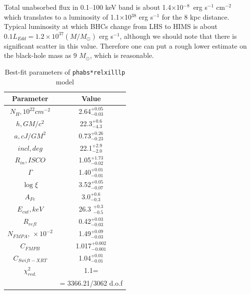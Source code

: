 \documentclass[a4paper,fleqn,usenatbib]{mnras}
\begin{document}
Total unabsorbed flux in 0.1--100 keV band is about 1.4$\times$10$^{-8}$~erg s$^{-1}$ cm$^{-2}$ which translates to a luminosity of 1.1$\times$10$^{38}$ erg s$^{-1}$ for the 8 kpc distance. 
Typical luminosity at which BHCs change from LHS to HIMS is about $0.1 L_{Edd} = 1.2\times10^{37} (M/M_{\odot})$ erg s$^{-1}$, although we should note that there is significant scatter in this value. 
Therefore one can put a rough lower estimate on the black-hole mass as 9 $M_{\odot}$, which is reasonable.

\begin{table}
\noindent
\centering
\caption{Best-fit parameters of \texttt{phabs*relxilllp} model}
\label{tab:fullfit}
\centering
\begin{tabular}{|c|c|}
\hline\hline
Parameter & Value \\
\hline
$N_{H}, 10^{22} cm^{-2}$ &   2.64$^{+0.05}_{-0.03}$ \\   
$h, GM/c^{2}$   &  22.3$^{+0.6}_{-4.3}$ \\
$a, cJ/GM^{2}$    & 0.73$^{+0.26}_{-0.23}$   \\
$incl, deg$ & 22.1$^{+2.9}_{-2.0}$ \\
$R_{in}, ISCO$  & 1.05$^{+1.73}_{-0.02}$ \\ 
$\Gamma$& 1.40$^{+0.01}_{-0.01}$   \\
$\log{\xi}$ &  3.52$^{+0.05}_{-0.07}$ \\
$A_{Fe}$   &  3.0$^{+0.6}_{-0.3}$  \\        
$E_{cut}, keV$    &       26.3 $^{+0.3}_{-0.5}$    \\
$R_{refl}$  &         0.42$^{+0.03}_{-0.03}$    \\
$N_{FMPA},\,\times10^{-2}$          &      1.49$^{+0.09}_{-0.03}$ \\
$C_{FMPB}$ & 1.017$^{+0.002}_{-0.001}$    \\
$C_{Swift-XRT}$    &   1.04$^{+0.01}_{-0.01}$\\
$\chi^{2}_{red.}$    &   1.1=\\ 
              &= 3366.21/3062 d.o.f\\
              
\hline
\end{tabular}
\end{table}
\end{document}
